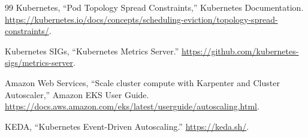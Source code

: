 \documentclass[conference]{IEEEtran}
\begin{document}
\begin{thebibliography}{99}
Kubernetes, ``Pod Topology Spread Constraints,'' Kubernetes Documentation.
\url{https://kubernetes.io/docs/concepts/scheduling-eviction/topology-spread-constraints/}.

Kubernetes SIGs, ``Kubernetes Metrics Server.''
\url{https://github.com/kubernetes-sigs/metrics-server}.

Amazon Web Services, ``Scale cluster compute with Karpenter and Cluster
Autoscaler,'' Amazon EKS User Guide.
\url{https://docs.aws.amazon.com/eks/latest/userguide/autoscaling.html}.

KEDA, ``Kubernetes Event-Driven Autoscaling.'' \url{https://keda.sh/}.

\end{thebibliography}
\end{document}
